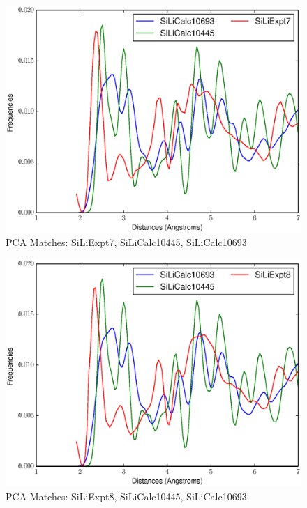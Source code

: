 \documentclass[12pt,letterpaper]{article}
\begin{document}
\begin{figure}[ht]
  \begin{center}
    \includegraphics[scale=0.8]{figs/PC10MatchSiLiExpt7-SiLiCalc10445-SiLiCalc10693.eps}
    \caption{PCA Matches: SiLiExpt7, SiLiCalc10445, SiLiCalc10693}
  \end{center}
\end{figure}

\begin{figure}[ht]
  \begin{center}
    \includegraphics[scale=0.8]{figs/PC10MatchSiLiExpt8-SiLiCalc10445-SiLiCalc10693.eps}
    \caption{PCA Matches: SiLiExpt8, SiLiCalc10445, SiLiCalc10693}
  \end{center}
\end{figure}
\clearpage
\end{document}
